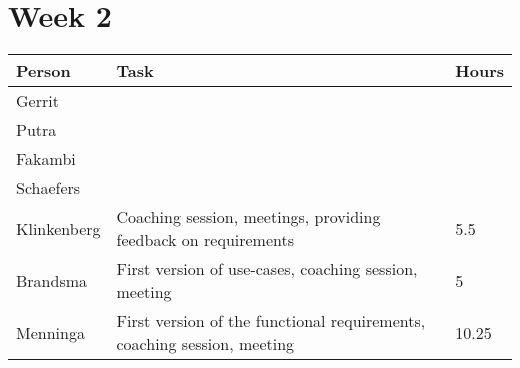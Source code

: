 \section{Week 2}
\begin{tabular}{p{} p{} p{}}
    \textbf{Person} & \textbf{Task} & \textbf{Hours} \\ \hline
	Gerrit &  &  \\ \hline
	Putra &  &  \\ \hline
	Fakambi & & \\ \hline
	Schaefers &  & \\ \hline
	Klinkenberg & Coaching session, meetings, providing feedback on requirements & 5.5\\ \hline
	Brandsma & First version of use-cases, coaching session, meeting & 5 \\ \hline
	Menninga & First version of the functional requirements, coaching session, meeting & 10.25 \\ \hline
\end{tabular}
